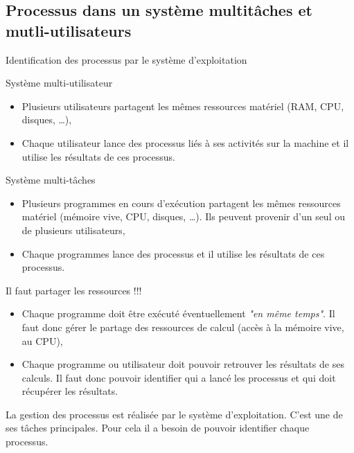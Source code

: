 \subsection{Processus dans un système multitâches et mutli-utilisateurs}
\begin{frame}{Identification des processus par le système
    d'exploitation}
  \begin{block}{Système multi-utilisateur}
    \begin{itemize}
    \item Plusieurs utilisateurs partagent les mêmes ressources matériel
      (RAM, CPU, disques, \dots),
    \item Chaque utilisateur lance des processus liés à ses activités
      sur la machine et il utilise les résultats de ces processus.
    \end{itemize}
  \end{block}
  \begin{block}{Système multi-tâches}
    \begin{itemize}
    \item Plusieurs programmes en cours d'exécution partagent les mêmes
      ressources matériel (mémoire vive, CPU, disques, \dots). Ils
      peuvent provenir d'un seul ou de plusieurs utilisateurs,
    \item Chaque programmes lance des processus et il utilise les
      résultats de ces processus.
    \end{itemize}
  \end{block}
  \begin{alertblock}{Il faut partager les ressources !!!}
    \begin{itemize}
    \item Chaque programme doit être exécuté éventuellement \textit{"en
        même temps"}. Il faut donc gérer le partage des ressources de
      calcul (accès à la mémoire vive, au CPU),
    \item Chaque programme ou utilisateur doit pouvoir retrouver les
      résultats de ses calculs. Il faut donc pouvoir identifier qui a
      lancé les processus et qui doit récupérer les résultats.
    \end{itemize}
    La gestion des processus est réalisée par le système
    d'exploitation. C'est une de ses tâches principales. Pour cela il a
    besoin de pouvoir identifier chaque processus.
  \end{alertblock}
\end{frame}
